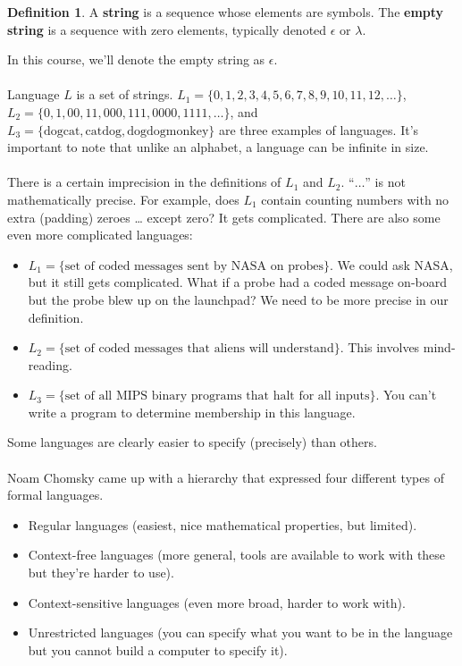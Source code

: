 \documentclass[]{article}
\theoremstyle{definition}
\newtheorem*{defn}{Definition}
\begin{document}
		\begin{defn}
			A \textbf{string} is a sequence whose elements are symbols. The \textbf{empty string} is a sequence with zero elements, typically denoted $\epsilon$ or $\lambda$.
		\end{defn}
		In this course, we'll denote the empty string as $\epsilon$.
		\\ \\
		Language $L$ is a set of strings. $L_1 = \{ 0, 1, 2, 3, 4, 5, 6, 7, 8, 9, 10, 11, 12, \ldots \}$, $L_2 = \{0, 1, 00, 11, 000, 111, 0000, 1111, \ldots\}$, and $L_3 = \{ \text{dogcat}, \text{catdog}, \text{dogdogmonkey} \}$ are three examples of languages. It's important to note that unlike an alphabet, a language can be infinite in size.
		\\ \\
		There is a certain imprecision in the definitions of $L_1$ and $L_2$. ``$\ldots$'' is not mathematically precise. For example, does $L_1$ contain counting numbers with no extra (padding) zeroes \ldots{} except zero? It gets complicated. There are also some even more complicated languages:
		\begin{itemize}
			\item $L_1 = \{ \text{set of coded messages sent by NASA on probes} \}$. We could ask NASA, but it still gets complicated. What if a probe had a coded message on-board but the probe blew up on the launchpad? We need to be more precise in our definition.
			\item $L_2 = \{ \text{set of coded messages that aliens will understand} \}$. This involves mind-reading.
			\item $L_3 = \{ \text{set of all MIPS binary programs that halt for all inputs} \}$. You can't write a program to determine membership in this language.
		\end{itemize}
		Some languages are clearly easier to specify (precisely) than others.
		\\ \\	
		Noam Chomsky came up with a hierarchy that expressed four different types of formal languages.
		\begin{itemize}
			\item Regular languages (easiest, nice mathematical properties, but limited).
			\item Context-free languages (more general, tools are available to work with these but they're harder to use).
			\item Context-sensitive languages (even more broad, harder to work with).
			\item Unrestricted languages (you can specify what you want to be in the language but you cannot build a computer to specify it).
		\end{itemize}
\end{document}
